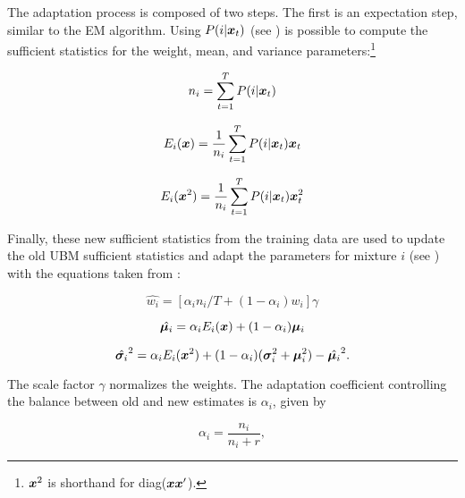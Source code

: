 The adaptation process is composed of two steps. The first is an expectation step, similar to the EM algorithm. Using $P(i|\boldsymbol{x}_t)$ (see ) is possible to compute the sufficient statistics for the weight, mean, and variance parameters:\footnote{$\boldsymbol{x}^2$ is shorthand for diag($\boldsymbol{x}\boldsymbol{x}'$).}

\begin{equation}
    n_i = \sum_{t=1}^{T} \postprob{i}{\dvec{x}_t}
    \label{eq:n_i}
\end{equation}

\begin{equation}
    E_i(\dvec{x}) = \frac{1}{n_i} \sum_{t=1}^{T} \postprob{i}{\dvec{x}_t} \dvec{x}_t
    \label{eq:E_x}
\end{equation}

\begin{equation}
    E_i(\dvec{x}^2) = \frac{1}{n_i} \sum_{t=1}^{T} \postprob{i}{\dvec{x}_t} \dvec{x}_t^2
    \label{eq:E_x2}
\end{equation}

Finally, these new sufficient statistics from the training data are used to update the old UBM sufficient statistics and adapt the parameters for mixture $i$ (see ) with the equations taken from :

\begin{equation}
    \hat{w_i} = [\alpha_i n_i / T + (1 - \alpha_i)w_i]\gamma
    \label{eq:adapted_weight}
\end{equation}

\begin{equation}
    \hat{\dvec{\mu}_i} = \alpha_i E_i(\dvec{x}) + (1 - \alpha_i)\dvec{\mu}_i
    \label{eq:adapted_means}
\end{equation}

\begin{equation}
    \hat{\dvec{\sigma}_i}^2 = \alpha_i E_i(\dvec{x}^2) + (1 - \alpha_i)(\dvec{\sigma}_i^2 + \dvec{\mu}_i^2) - \hat{\dvec{\mu}_i}^2.
    \label{eq:adapted_variances}
\end{equation}

The scale factor $\gamma$ normalizes the weights. \noindent The adaptation coefficient controlling the balance between old and new estimates is $\alpha_i$, given by

\begin{equation}
    \alpha_i = \frac{n_i}{n_i + r},
    \label{eq:alpha_i}
\end{equation}

